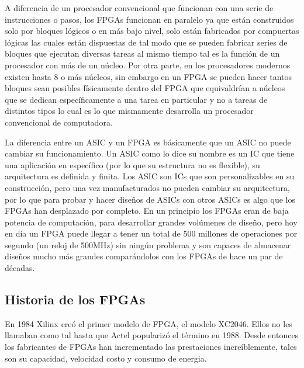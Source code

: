 \documentclass[twoside,spanish,ESP,MSc]{plantillaLabUPV}
\theoremstyle{definition}
\newcommand{\f}{FPGA }
\newcommand{\fs}{FPGAs }
\begin{document}
A diferencia de un procesador convencional que funcionan con una serie de instrucciones o pasos, los \fs funcionan en paralelo ya que están construidos solo por bloques lógicos o en más bajo nivel, solo están fabricados por compuertas lógicas las cuales están dispuestas de tal modo que se pueden fabricar series de bloques que ejecutan diversas tareas al mismo tiempo tal es la función de un procesador con más de un núcleo. Por otra parte, en los procesadores modernos existen hasta 8 o más núcleos, sin embargo en un \f se pueden hacer tantos bloques sean posibles físicamente dentro del \f que equivaldrían a núcleos que se dedican específicamente a una tarea en particular y no a tareas de distintos tipos lo cual es lo que mismamente desarrolla un procesador convencional de computadora. 



La diferencia entre un ASIC y un \f es básicamente que un ASIC no puede cambiar su funcionamiento. Un ASIC como lo dice su nombre es un IC que tiene una aplicación en específico (por lo que su estructura no es flexible), su arquitectura es definida y finita. Los ASIC son ICs que son personalizables en su construcción, pero una vez manufacturados no pueden cambiar su arquitectura, por lo que para probar y hacer diseños de ASICs con otros ASICs es algo que los \fs han desplazado por completo. En un principio los \fs eran de baja potencia de computación, para desarrollar grandes volúmenes de diseño, pero hoy en día un \f puede llegar a tener un total de 500 millones de operaciones por segundo (un reloj de 500MHz) sin ningún problema y son capaces de almacenar diseños mucho más grandes comparándolos con los \fs de hace un par de décadas.

\subsection{Historia de los FPGAs}
En 1984 Xilinx creó el primer modelo de FPGA, el modelo XC2046. Ellos no les llamaban como tal hasta que Actel popularizó el término en 1988. Desde entonces los fabricantes de \fs han incrementado las prestaciones increíblemente, tales son su capacidad, velocidad costo y consumo de energia.
\end{document}
